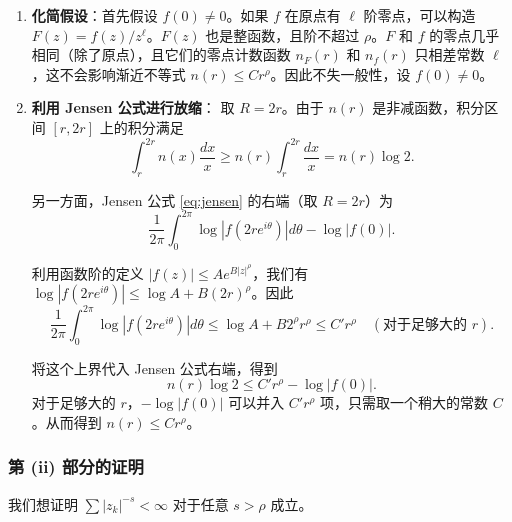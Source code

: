 \documentclass[UTF8]{ctexart}
\numberwithin{equation}{section}
\begin{document}
\begin{enumerate}
\item \textbf{化简假设}：首先假设 \(f(0) \neq 0\)。如果 \(f\) 在原点有 \(\ell\) 阶零点，可以构造 \(F(z) = f(z)/z^\ell\)。\(F(z)\) 也是整函数，且阶不超过 \(\rho\)。\(F\) 和 \(f\) 的零点几乎相同（除了原点），且它们的零点计数函数 \(n_F(r)\) 和 \(n_f(r)\) 只相差常数 \(\ell\)，这不会影响渐近不等式 \(n(r) \le C r^\rho\)。因此不失一般性，设 \(f(0) \neq 0\)。

\item \textbf{利用 Jensen 公式进行放缩}：
取 \(R = 2r\)。由于 \(n(r)\) 是非减函数，积分区间 \([r, 2r]\) 上的积分满足
\begin{equation}
\int_r^{2r} n(x) \frac{dx}{x} \ge n(r) \int_r^{2r} \frac{dx}{x} = n(r) \log 2.
\end{equation}

另一方面，Jensen 公式 \eqref{eq:jensen} 的右端（取 \(R=2r\)）为
\begin{equation}
\frac{1}{2\pi} \int_0^{2\pi} \log |f(2r e^{i\theta})| d\theta - \log |f(0)|.
\end{equation}

利用函数阶的定义 \(|f(z)| \le A e^{B|z|^\rho}\)，我们有 \(\log |f(2r e^{i\theta})| \le \log A + B(2r)^\rho\)。因此
\begin{equation}
\frac{1}{2\pi} \int_0^{2\pi} \log |f(2r e^{i\theta})| d\theta \le \log A + B 2^\rho r^\rho \le C' r^\rho \quad (\text{对于足够大的 } r).
\end{equation}

将这个上界代入 Jensen 公式右端，得到
\begin{equation}
n(r) \log 2 \le C' r^\rho - \log |f(0)|.
\end{equation}
对于足够大的 \(r\)，\(- \log |f(0)|\) 可以并入 \(C' r^\rho\) 项，只需取一个稍大的常数 \(C\)。从而得到 \(n(r) \le C r^\rho\)。
\end{enumerate}

\subsubsection{第 (ii) 部分的证明}

我们想证明 \(\sum |z_k|^{-s} < \infty\) 对于任意 \(s > \rho\) 成立。
\end{document}
